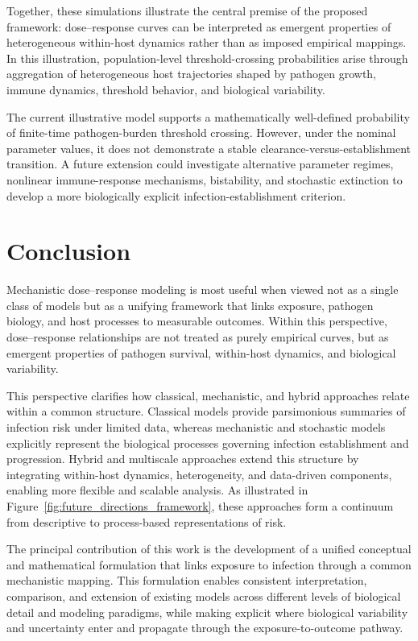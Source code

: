 \documentclass[11pt]{article}
\begin{document}
Together, these simulations illustrate the central premise of the
proposed framework: dose--response curves can be interpreted as
emergent properties of heterogeneous within-host dynamics rather than
as imposed empirical mappings. In this illustration, population-level
threshold-crossing probabilities arise through aggregation of heterogeneous
host trajectories shaped by pathogen growth, immune dynamics,
threshold behavior, and biological variability.

The current illustrative model supports a
mathematically well-defined probability of
finite-time pathogen-burden threshold crossing. However, under the nominal parameter values,
it does not demonstrate a stable
clearance-versus-establishment transition. A future extension could investigate alternative
parameter regimes, nonlinear immune-response
mechanisms, bistability, and stochastic extinction
to develop a more biologically explicit
infection-establishment criterion.

\section{Conclusion}
\label{sec:conclusion}

Mechanistic dose--response modeling is most useful when viewed not as a single class of models but as a unifying framework that links exposure, pathogen biology, and host processes to measurable outcomes. Within this perspective, dose--response relationships are not treated as purely empirical curves, but as emergent properties of pathogen survival, within-host dynamics, and biological variability.

This perspective clarifies how classical, mechanistic, and hybrid approaches relate within a common structure. Classical models provide parsimonious summaries of infection risk under limited data, whereas mechanistic and stochastic models explicitly represent the biological processes governing infection establishment and progression. Hybrid and multiscale approaches extend this structure by integrating within-host dynamics, heterogeneity, and data-driven components, enabling more flexible and scalable analysis. As illustrated in Figure~\ref{fig:future_directions_framework}, these approaches form a continuum from descriptive to process-based representations of risk.

The principal contribution of this work is the development of a unified conceptual and mathematical formulation that links exposure to infection through a common mechanistic mapping. This formulation enables consistent interpretation, comparison, and extension
of existing models across different levels of biological detail and modeling
paradigms, while making explicit where biological variability and uncertainty
enter and propagate through the exposure-to-outcome pathway. %
\end{document}
